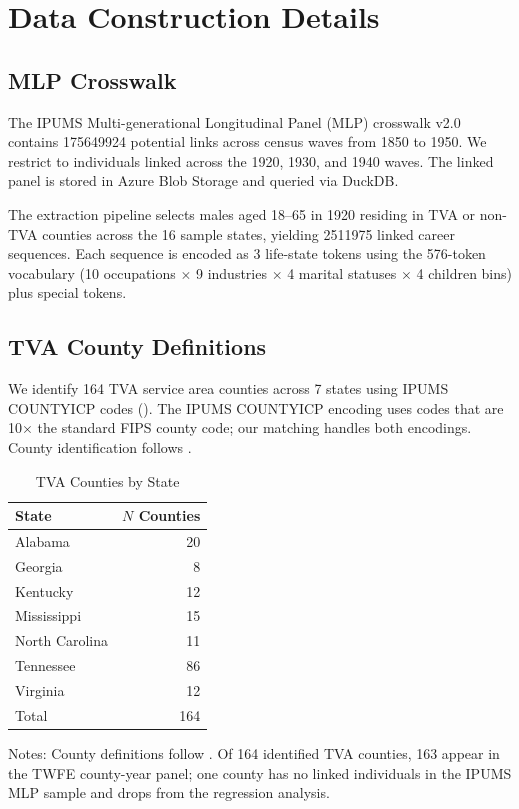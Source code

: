 \documentclass[12pt]{article}
\begin{document}
\newpage
\appendix

\section{Data Construction Details}
\label{app:data}

\subsection{MLP Crosswalk}

The IPUMS Multi-generational Longitudinal Panel (MLP) crosswalk v2.0 contains \num{175649924} potential links across census waves from 1850 to 1950. We restrict to individuals linked across the 1920, 1930, and 1940 waves. The linked panel is stored in Azure Blob Storage and queried via DuckDB.

The extraction pipeline selects males aged 18--65 in 1920 residing in TVA or non-TVA counties across the 16 sample states, yielding \num{2511975} linked career sequences. Each sequence is encoded as 3 life-state tokens using the 576-token vocabulary (10 occupations $\times$ 9 industries $\times$ 4 marital statuses $\times$ 4 children bins) plus special tokens.

\subsection{TVA County Definitions}

We identify 164 TVA service area counties across 7 states using IPUMS COUNTYICP codes (). The IPUMS COUNTYICP encoding uses codes that are 10$\times$ the standard FIPS county code; our matching handles both encodings. County identification follows \citet{kline2014}.

\begin{table}[H]
\centering
\caption{TVA Counties by State}
\label{tab:tva_counties}
\begin{tabular}{lr}
\toprule
State & $N$ Counties \\
\midrule
Alabama & 20 \\
Georgia & 8 \\
Kentucky & 12 \\
Mississippi & 15 \\
North Carolina & 11 \\
Tennessee & 86 \\
Virginia & 12 \\
\midrule
Total & 164 \\
\bottomrule
\end{tabular}
\begin{tablenotes}[flushleft]
\small
\item Notes: County definitions follow \citet{kline2014}. Of 164 identified TVA counties, 163 appear in the TWFE county-year panel; one county has no linked individuals in the IPUMS MLP sample and drops from the regression analysis.
\end{tablenotes}
\end{table}
\end{document}
